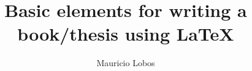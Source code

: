 \documentclass[a4paper]{book}
\begin{document}

\pagestyle{empty}
\title{Basic elements for writing a book/thesis using \LaTeX}
\author{Mauricio Lobos}
\date{}
\maketitle

\tableofcontents
\pagenumbering{}






%

%
%
%
%


\begin{appendix}


\end{appendix}


%



\listoffigures
\listoftables

\printindex

\end{document}
